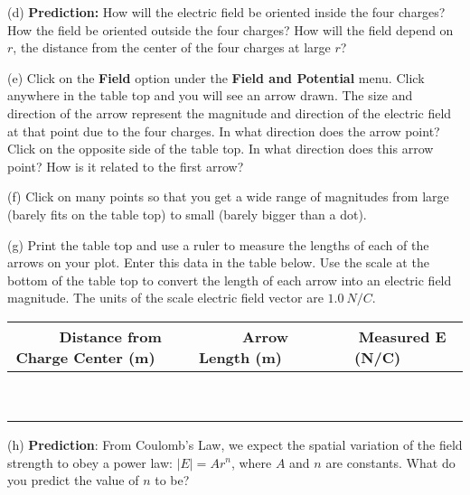 (d) {\bf Prediction:} How will the electric field be oriented inside the four charges?
How the field be oriented outside the four charges?
How will the field depend on $r$, the distance from the center of the four charges
at large $r$?
\vspace{25mm}

(e) Click on the \textbf{Field} option under the \textbf{Field and Potential} menu.
Click anywhere in the table top and you will see an arrow drawn.
The size and direction of the arrow represent the magnitude and direction of
the electric field at that point due to the four charges.
In what direction does the arrow point?
Click on the opposite side of the table top.
In what direction does this arrow point? How is it related to the first arrow?
\vspace{15mm}

(f) Click on many points so that you get a wide range of magnitudes from large
(barely fits on the table top) to small (barely bigger than a dot).

(g) Print the table top and use a ruler to measure the lengths of each of the arrows
on your plot. Enter this data in the table below.
Use the scale at the bottom of the table top to convert the length of each arrow into 
an electric field magnitude.
The units of the scale electric field vector are $1.0 ~ N/C$.

\vspace{0.3cm}
{\centering \begin{tabular}{|c|c|c|}
\hline 
~~~Distance from Charge Center (m)~~~&
~~~Arrow Length (m)~~~&
~~~Measured E (N/C)~~~\\
\hline
\hline 
&
&
\\
\hline 
&
&
\\
\hline 
&
&
\\
\hline 
&
&
\\
\hline 
&
&
\\
\hline 
&
&
\\
\hline 
&
&
\\
\hline 
&
&
\\
\hline 
&
&
\\
\hline
\end{tabular}\par}
\vspace{0.3cm}


(h) \textbf{Prediction}: From Coulomb's Law, we expect the spatial variation
of the field strength to obey a power law: \( \left| E\right| =Ar^{n} \),
where \( A \) and \( n \) are constants. What do you predict the
value of \( n \) to be?\vspace{15mm}

